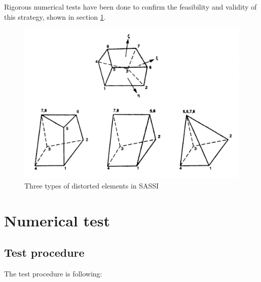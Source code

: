 \documentclass{article}
\begin{document}
Rigorous numerical tests have been done to confirm the feasibility and validity of this strategy, shown in section \ref{sec:numerical test}.   

\begin{figure}[H]
\begin{center}
\includegraphics[width=\textwidth]{images/SASSI_distorted_element.png}
\end{center}
\caption{\label{Fig:three types of distorted element} Three types of distorted elements in SASSI}
\end{figure}


\section{Numerical test}\label{sec:numerical test}

\subsection{Test procedure}

The test procedure is following:
\end{document}
